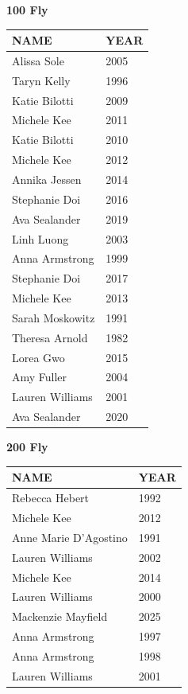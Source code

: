\begin{table}[H]
\centering
\begin{minipage}[t]{0.48\textwidth}
\centering
\textbf{100 Fly}\\[0.1cm]
\begin{tabular}{@{}p{2.8cm}p{1.2cm}@{}}
\hline
    \textbf{NAME} & \textbf{YEAR} \\
\hline
    Alissa Sole & 2005 \\
    Taryn Kelly & 1996 \\
    Katie Bilotti & 2009 \\
    Michele Kee & 2011 \\
    Katie Bilotti & 2010 \\
    Michele Kee & 2012 \\
    Annika Jessen & 2014 \\
    Stephanie Doi & 2016 \\
    Ava Sealander & 2019 \\
    Linh Luong & 2003 \\
    Anna Armstrong & 1999 \\
    Stephanie Doi & 2017 \\
    Michele Kee & 2013 \\
    Sarah Moskowitz & 1991 \\
    Theresa Arnold & 1982 \\
    Lorea Gwo & 2015 \\
    Amy Fuller & 2004 \\
    Lauren Williams & 2001 \\
    Ava Sealander & 2020 \\
\hline
\end{tabular}
\end{minipage}\hfill
\begin{minipage}[t]{0.48\textwidth}
\centering
\textbf{200 Fly}\\[0.1cm]
\begin{tabular}{@{}p{2.8cm}p{1.2cm}@{}}
\hline
    \textbf{NAME} & \textbf{YEAR} \\
\hline
    Rebecca Hebert & 1992 \\
    Michele Kee & 2012 \\
    Anne Marie D'Agostino & 1991 \\
    Lauren Williams & 2002 \\
    Michele Kee & 2014 \\
    Lauren Williams & 2000 \\
    Mackenzie Mayfield & 2025 \\
    Anna Armstrong & 1997 \\
    Anna Armstrong & 1998 \\
    Lauren Williams & 2001 \\
\hline
\end{tabular}
\end{minipage}
\end{table}

